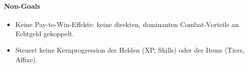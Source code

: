 \paragraph{Non-Goals}
\begin{itemize}
	\item Keine Pay-to-Win-Effekte: keine direkten, dominanten Combat-Vorteile an Echtgeld gekoppelt.
	\item Steuert keine Kernprogression der Helden (XP, Skills) oder der Items (Tiers, Affixe).
\end{itemize}































